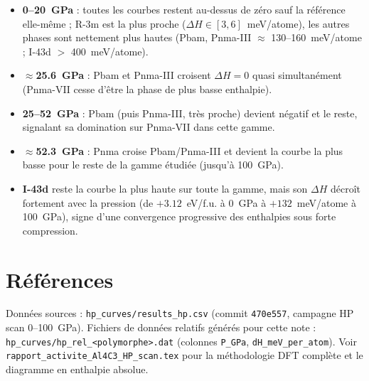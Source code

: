 \documentclass[11pt,a4paper]{article}
\begin{document}
\begin{itemize}
  \item \textbf{0--20~GPa} : toutes les courbes restent au-dessus de zéro sauf la référence
  elle-même ; R-3m est la plus proche ($\Delta H \in [3, 6]$~meV/atome), les autres phases sont
  nettement plus hautes (Pbam, Pnma-III $\approx$ 130--160~meV/atome ; I-43d $>$ 400~meV/atome).
  \item \textbf{$\approx$25.6~GPa} : Pbam et Pnma-III croisent $\Delta H = 0$ quasi simultanément
  (Pnma-VII cesse d'être la phase de plus basse enthalpie).
  \item \textbf{25--52~GPa} : Pbam (puis Pnma-III, très proche) devient négatif et le reste,
  signalant sa domination sur Pnma-VII dans cette gamme.
  \item \textbf{$\approx$52.3~GPa} : Pnma croise Pbam/Pnma-III et devient la courbe la plus
  basse pour le reste de la gamme étudiée (jusqu'à 100~GPa).
  \item \textbf{I-43d} reste la courbe la plus haute sur toute la gamme, mais son $\Delta H$
  décroît fortement avec la pression (de $+3.12$~eV/f.u. à 0~GPa à $+132$~meV/atome à
  100~GPa), signe d'une convergence progressive des enthalpies sous forte compression.
\end{itemize}

\appendix
\section{Références}

Données sources : \texttt{hp\_curves/results\_hp.csv} (commit \texttt{470e557}, campagne HP
scan 0--100~GPa). Fichiers de données relatifs générés pour cette note :
\texttt{hp\_curves/hp\_rel\_<polymorphe>.dat} (colonnes \texttt{P\_GPa},
\texttt{dH\_meV\_per\_atom}). Voir \texttt{rapport\_activite\_Al4C3\_HP\_scan.tex} pour la
méthodologie DFT complète et le diagramme en enthalpie absolue.
\end{document}
